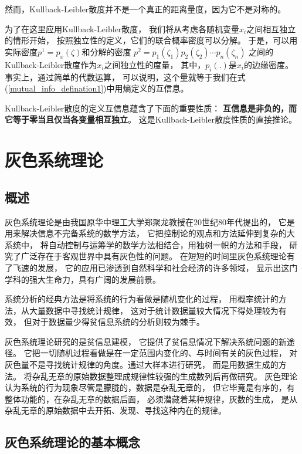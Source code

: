 然而，Kullback-Leibler散度并不是一个真正的距离量度，因为它不是对称的。

为了在这里应用Kullback-Leibler散度，
我们将从考虑各随机变量$x_i$之间相互独立的情形开始，
按照独立性的定义，它们的联合概率密度可以分解。
于是，可以用实际密度$p^1=p_x(\zeta)$和分解的密度
$p^2=p_1(\zeta_1)p_2(\zeta_2)\cdots p_n(\zeta_n)$
之间的Kullback-Leibler散度作为$x_i$之间独立性的度量，
其中，$p_i(.)$是$x_i$的边缘密度。事实上，通过简单的代数运算，
可以说明，这个量就等于我们在式(\ref{mutual_info_defination1})中用熵定义的互信息。

Kullback-Leibler散度的定义互信息蕴含了下面的重要性质：
\textbf{互信息是非负的，而它等于零当且仅当各变量相互独立}。
这是Kullback-Leibler散度性质的直接推论。
 

\section{灰色系统理论}
\subsection{概述}
灰色系统理论是由我国原华中理工大学郑聚龙教授在20世纪80年代提出的，
它是用来解决信息不完备系统的数学方法，
它把控制论的观点和方法延伸到复杂的大系统中，
将自动控制与运筹学的数学方法相结合，用独树一帜的方法和手段，
研究了广泛存在于客观世界中具有灰色性的问题。
在短短的时间里灰色系统理论有了飞速的发展，
它的应用已渗透到自然科学和社会经济的许多领域，
显示出这门学科的强大生命力，具有广阔的发展前景。

系统分析的经典方法是将系统的行为看做是随机变化的过程，
用概率统计的方法，从大量数据中寻找统计规律，
这对于统计数据量较大情况下得处理较为有效，
但对于数据量少得贫信息系统的分析则较为棘手。

灰色系统理论研究的是贫信息建模，
它提供了贫信息情况下解决系统问题的新途径。
它把一切随机过程看做是在一定范围内变化的、与时间有关的灰色过程，
对灰色量不是寻找统计规律的角度。通过大样本进行研究，
而是用数据生成的方法。
将杂乱无章的原始数据整理成规律性较强的生成数列后再做研究。
灰色理论认为系统的行为现象尽管是朦胧的，数据是杂乱无章的，
但它毕竟是有序的，有整体功能的，在杂乱无章的数据后面，
必须潜藏着某种规律，灰数的生成，
是从杂乱无章的原始数据中去开拓、发现、寻找这种内在的规律。

\subsection{灰色系统理论的基本概念}
